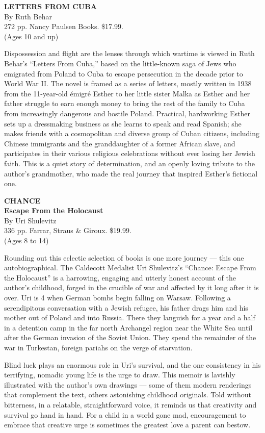 \textbf{LETTERS FROM CUBA}\\
By Ruth Behar\\
272 pp. Nancy Paulsen Books. \$17.99.\\
(Ages 10 and up)

Dispossession and flight are the lenses through which wartime is viewed
in Ruth Behar's ``Letters From Cuba,'' based on the little-known saga of
Jews who emigrated from Poland to Cuba to escape persecution in the
decade prior to World War II. The novel is framed as a series of
letters, mostly written in 1938 from the 11-year-old émigré Esther to
her little sister Malka as Esther and her father struggle to earn enough
money to bring the rest of the family to Cuba from increasingly
dangerous and hostile Poland. Practical, hardworking Esther sets up a
dressmaking business as she learns to speak and read Spanish; she makes
friends with a cosmopolitan and diverse group of Cuban citizens,
including Chinese immigrants and the granddaughter of a former African
slave, and participates in their various religious celebrations without
ever losing her Jewish faith. This is a quiet story of determination,
and an openly loving tribute to the author's grandmother, who made the
real journey that inspired Esther's fictional one.

\textbf{CHANCE}\\
\textbf{Escape From the Holocaust}\\
By Uri Shulevitz\\
336 pp. Farrar, Straus \& Giroux. \$19.99.\\
(Ages 8 to 14)

Rounding out this eclectic selection of books is one more journey ---
this one autobiographical. The Caldecott Medalist Uri Shulevitz's
``Chance: Escape From the Holocaust'' is a harrowing, engaging and
utterly honest account of the author's childhood, forged in the crucible
of war and affected by it long after it is over. Uri is 4 when German
bombs begin falling on Warsaw. Following a serendipitous conversation
with a Jewish refugee, his father drags him and his mother out of Poland
and into Russia. There they languish for a year and a half in a
detention camp in the far north Archangel region near the White Sea
until after the German invasion of the Soviet Union. They spend the
remainder of the war in Turkestan, foreign pariahs on the verge of
starvation.

Blind luck plays an enormous role in Uri's survival, and the one
consistency in his terrifying, nomadic young life is the urge to draw.
This memoir is lavishly illustrated with the author's own drawings ---
some of them modern renderings that complement the text, others
astonishing childhood originals. Told without bitterness, in a
relatable, straightforward voice, it reminds us that creativity and
survival go hand in hand. For a child in a world gone mad, encouragement
to embrace that creative urge is sometimes the greatest love a parent
can bestow.

